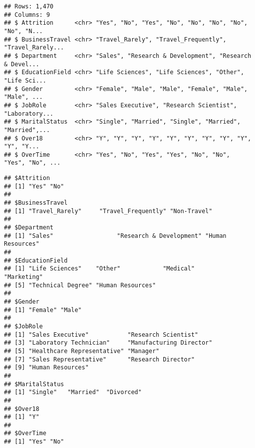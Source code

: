 \documentclass[
]{article}
\newenvironment{Shaded}{\begin{snugshade}}{\end{snugshade}}
\newcommand{\CommentTok}[1]{\textcolor[rgb]{0.56,0.35,0.01}{\textit{#1}}}
\newcommand{\KeywordTok}[1]{\textcolor[rgb]{0.13,0.29,0.53}{\textbf{#1}}}
\newcommand{\NormalTok}[1]{#1}
\newcommand{\OperatorTok}[1]{\textcolor[rgb]{0.81,0.36,0.00}{\textbf{#1}}}
\newcommand{\StringTok}[1]{\textcolor[rgb]{0.31,0.60,0.02}{#1}}
\begin{document}
\begin{Shaded}
\end{Shaded}

\begin{verbatim}
## Rows: 1,470
## Columns: 9
## $ Attrition      <chr> "Yes", "No", "Yes", "No", "No", "No", "No", "No", "N...
## $ BusinessTravel <chr> "Travel_Rarely", "Travel_Frequently", "Travel_Rarely...
## $ Department     <chr> "Sales", "Research & Development", "Research & Devel...
## $ EducationField <chr> "Life Sciences", "Life Sciences", "Other", "Life Sci...
## $ Gender         <chr> "Female", "Male", "Male", "Female", "Male", "Male", ...
## $ JobRole        <chr> "Sales Executive", "Research Scientist", "Laboratory...
## $ MaritalStatus  <chr> "Single", "Married", "Single", "Married", "Married",...
## $ Over18         <chr> "Y", "Y", "Y", "Y", "Y", "Y", "Y", "Y", "Y", "Y", "Y...
## $ OverTime       <chr> "Yes", "No", "Yes", "Yes", "No", "No", "Yes", "No", ...
\end{verbatim}

\begin{Shaded}
\end{Shaded}

\begin{verbatim}
## $Attrition
## [1] "Yes" "No" 
## 
## $BusinessTravel
## [1] "Travel_Rarely"     "Travel_Frequently" "Non-Travel"       
## 
## $Department
## [1] "Sales"                  "Research & Development" "Human Resources"       
## 
## $EducationField
## [1] "Life Sciences"    "Other"            "Medical"          "Marketing"       
## [5] "Technical Degree" "Human Resources" 
## 
## $Gender
## [1] "Female" "Male"  
## 
## $JobRole
## [1] "Sales Executive"           "Research Scientist"       
## [3] "Laboratory Technician"     "Manufacturing Director"   
## [5] "Healthcare Representative" "Manager"                  
## [7] "Sales Representative"      "Research Director"        
## [9] "Human Resources"          
## 
## $MaritalStatus
## [1] "Single"   "Married"  "Divorced"
## 
## $Over18
## [1] "Y"
## 
## $OverTime
## [1] "Yes" "No"
\end{verbatim}
\end{document}
